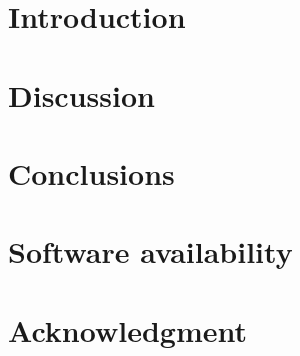 \documentclass{cas-dc} %
\numberwithin{equation}{section}
\begin{document}

\maketitle

\section{Introduction}




\section{Discussion}

\section{Conclusions}

\section*{Software availability}

\section*{Acknowledgment}


\sloppy %
\printbibliography
\fussy %

%
%
\end{document}
